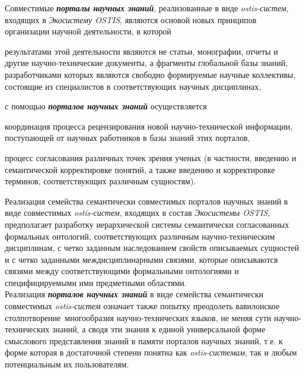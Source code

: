 \begin{SCn}
\begin{scnsubstruct}
{        Совместимые \textbf{\textit{порталы научных знаний}}, реализованные в виде \textit{ostis-систем}, входящих в \textit{Экосистему OSTIS}, являются основой новых принципов организации научной деятельности, в которой
        \begin{scnitemize}
            \item результатами этой деятельности являются не статьи, монографии, отчеты и другие научно-технические документы, а фрагменты глобальной базы знаний, разработчиками которых являются свободно формируемые научные коллективы, состоящие из специалистов в соответствующих научных дисциплинах,
            \item с помощью \textbf{\textit{порталов научных знаний}} осуществляется
            \begin{scnitemizeii}
                \item координация процесса рецензирования новой научно-технической информации, поступающей от научных работников в базы знаний этих порталов,
                \item процесс согласования различных точек зрения ученых (в частности, введению и семантической корректировке понятий, а также введению и корректировке терминов, соответствующих различным сущностям).
            \end{scnitemizeii}
        \end{scnitemize}
        Реализация семейства семантически совместимых порталов научных знаний в виде совместимых \textit{\mbox{ostis-систем}}, входящих в состав \textit{Экосистемы OSTIS}, предполагает разработку иерархической системы семантически согласованных формальных онтологий, соответствующих различным научно-техническим дисциплинам, с четко заданным наследованием свойств описываемых сущностей и с четко заданными междисциплинарными связями, которые описываются связями между соответствующими формальными онтологиями и специфицируемыми ими предметными областями.\\
        Реализация \textbf{\textit{порталов научных знаний}} в виде семейства семантически совместимых \textit{ostis-систем} означает также попытку преодолеть вавилонское столпотворение\ многообразия научно-технических языков, не меняя сути научно-технических знаний, а сводя эти знания к единой универсальной форме смыслового представления знаний в памяти порталов научных знаний, т.е. к форме которая в достаточной степени понятна как \textit{ostis-системам}, так и любым потенциальным их пользователям.}

\end{scnsubstruct}
\end{SCn}
